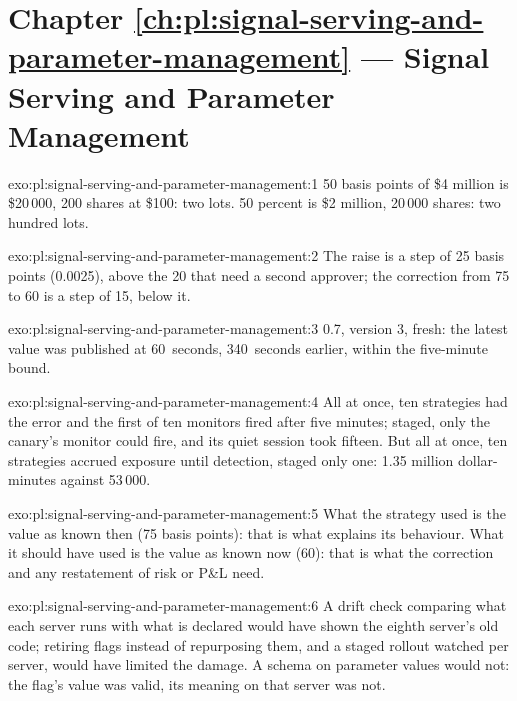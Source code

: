 \section*{Chapter \ref{ch:pl:signal-serving-and-parameter-management} --- Signal Serving and Parameter Management}

\begin{solution}{exo:pl:signal-serving-and-parameter-management:1}
50 basis points of \$4 million is \$20\,000, 200 shares at \$100: two lots. 50 percent is \$2 million, 20\,000 shares: two hundred lots.
\end{solution}

\begin{solution}{exo:pl:signal-serving-and-parameter-management:2}
The raise is a step of 25 basis points (0.0025), above the 20 that need a second approver; the correction from 75 to 60 is a step of 15, below
it.
\end{solution}

\begin{solution}{exo:pl:signal-serving-and-parameter-management:3}
0.7, version 3, fresh: the latest value was published at 60~seconds, 340~seconds earlier, within the five-minute bound.
\end{solution}

\begin{solution}{exo:pl:signal-serving-and-parameter-management:4}
All at once, ten strategies had the error and the first of ten monitors fired after five minutes; staged, only the canary's monitor could fire,
and its quiet session took fifteen. But all at once, ten strategies accrued exposure until detection, staged only one: 1.35 million
dollar-minutes against 53\,000.
\end{solution}

\begin{solution}{exo:pl:signal-serving-and-parameter-management:5}
What the strategy used is the value as known then (75 basis points): that is what explains its behaviour. What it should have used is the value
as known now (60): that is what the correction and any restatement of risk or P\&L need.
\end{solution}

\begin{solution}{exo:pl:signal-serving-and-parameter-management:6}
A drift check comparing what each server runs with what is declared would have shown the eighth server's old code; retiring flags instead of
repurposing them, and a staged rollout watched per server, would have limited the damage. A schema on parameter values would not: the flag's
value was valid, its meaning on that server was not.
\end{solution}

